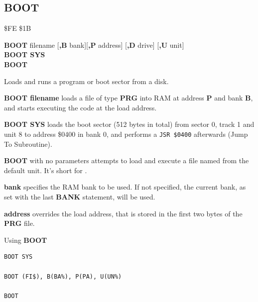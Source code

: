 \subsection{BOOT}
\begin{description}[leftmargin=2cm,style=nextline]
\item [Token:]    \$FE \$1B

\item [Format:]   {\bf BOOT} filename [{\bf,B} bank][{\bf,P} address] [{\bf,D} drive] [{\bf,U} unit] \\
                  {\bf BOOT SYS} \\
                  {\bf BOOT}

\item [Usage:]    Loads and runs a program or boot sector from a disk.

                  {\bf BOOT filename} loads a file of type {\bf PRG} into RAM at address {\bf P} and bank {\bf B}, and starts executing the code at the load address.

                  {\bf BOOT SYS} loads the boot sector (512 bytes in total) from sector 0, track 1 and unit 8 to address \$0400 in bank 0, and performs a \texttt{JSR \$0400} afterwards (Jump To Subroutine).

                  {\bf BOOT} with no parameters attempts to load and execute a file named  from the default unit. It's short for .

                  \filenamedefinition

                  {\bf bank} specifies the RAM bank to be used. If not specified, the current bank, as set with the last {\bf BANK} statement, will be used.

                  {\bf address} overrides the load address, that is stored in the first two bytes of the {\bf PRG} file.

                  \drivedefinition

                  \unitdefinition

\item [Examples:] Using {\bf BOOT}

\begin{tcolorbox}[colback=black,coltext=white]
\verbatimfont{\codefont}
\begin{verbatim}
BOOT SYS

BOOT (FI$), B(BA%), P(PA), U(UN%)

BOOT
\end{verbatim}
\end{tcolorbox}
\end{description}


